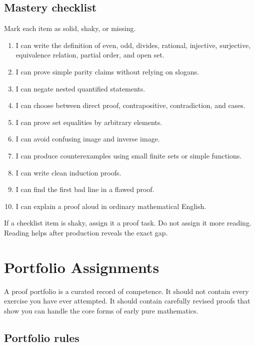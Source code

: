 \subsection{Mastery checklist}

Mark each item as solid, shaky, or missing.

\begin{enumerate}
\item I can write the definition of even, odd, divides, rational, injective, surjective, equivalence relation, partial order, and open set.
\item I can prove simple parity claims without relying on slogans.
\item I can negate nested quantified statements.
\item I can choose between direct proof, contrapositive, contradiction, and cases.
\item I can prove set equalities by arbitrary elements.
\item I can avoid confusing image and inverse image.
\item I can produce counterexamples using small finite sets or simple functions.
\item I can write clean induction proofs.
\item I can find the first bad line in a flawed proof.
\item I can explain a proof aloud in ordinary mathematical English.
\end{enumerate}

\begin{focusbox}
If a checklist item is shaky, assign it a proof task. Do not assign it more reading. Reading helps after production reveals the exact gap.
\end{focusbox}

\section{Portfolio Assignments}
\chapterline

A proof portfolio is a curated record of competence. It should not contain every exercise you have ever attempted. It should contain carefully revised proofs that show you can handle the core forms of early pure mathematics.

\subsection{Portfolio rules}

